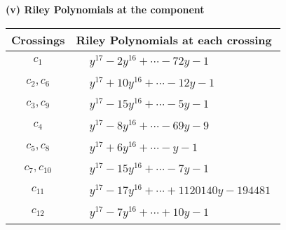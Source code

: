 \documentclass[1p]{elsarticle_modified}
\theoremstyle{definition}
\begin{document}
\newpage\renewcommand{\arraystretch}{1}
\flushleft \textbf{(v) Riley Polynomials at the component}\newline \\
\begin{tabular}{m{50pt}|m{274pt}}
Crossings & \hspace{64pt}Riley Polynomials at each crossing \\
\hline $$\begin{aligned}c_{1}\end{aligned}$$&$\begin{aligned}
&y^{17}-2 y^{16}+\cdots-72 y-1
\end{aligned}$\\
\hline $$\begin{aligned}c_{2},c_{6}\end{aligned}$$&$\begin{aligned}
&y^{17}+10 y^{16}+\cdots-12 y-1
\end{aligned}$\\
\hline $$\begin{aligned}c_{3},c_{9}\end{aligned}$$&$\begin{aligned}
&y^{17}-15 y^{16}+\cdots-5 y-1
\end{aligned}$\\
\hline $$\begin{aligned}c_{4}\end{aligned}$$&$\begin{aligned}
&y^{17}-8 y^{16}+\cdots-69 y-9
\end{aligned}$\\
\hline $$\begin{aligned}c_{5},c_{8}\end{aligned}$$&$\begin{aligned}
&y^{17}+6 y^{16}+\cdots- y-1
\end{aligned}$\\
\hline $$\begin{aligned}c_{7},c_{10}\end{aligned}$$&$\begin{aligned}
&y^{17}-15 y^{16}+\cdots-7 y-1
\end{aligned}$\\
\hline $$\begin{aligned}c_{11}\end{aligned}$$&$\begin{aligned}
&y^{17}-17 y^{16}+\cdots+1120140 y-194481
\end{aligned}$\\
\hline $$\begin{aligned}c_{12}\end{aligned}$$&$\begin{aligned}
&y^{17}-7 y^{16}+\cdots+10 y-1
\end{aligned}$\\
\hline
\end{tabular}\\~\\
\end{document}
